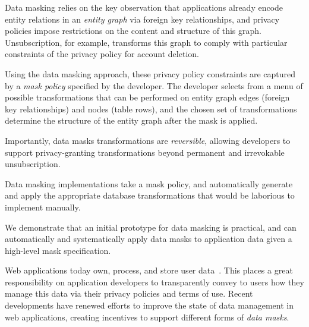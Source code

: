 Data masking relies on the key observation that applications already encode entity relations in an
\emph{entity graph} via \eg foreign key relationships, and privacy policies impose restrictions on the
content and structure of this graph. Unsubscription, for example, transforms this graph to comply
with particular constraints of the privacy policy for account deletion.

Using the data masking approach, these privacy policy constraints are captured by a \emph{mask
policy} specified by the developer. The developer selects from a menu of
possible transformations that can be performed on entity graph edges (foreign key relationships) and
nodes (table rows), and the chosen set of transformations determine the structure of the 
entity graph after the mask is applied. 

Importantly, data masks transformations are \emph{reversible}, allowing developers to support
privacy-granting transformations beyond permanent and irrevokable unsubscription. 

Data masking implementations take a mask policy, and automatically generate and apply the
appropriate database transformations that would be laborious to implement manually. 

We demonstrate that an initial prototype for data masking is practical, and can automatically and
systematically apply data masks to application data given a high-level mask specification.

%

\iffalse
Web applications today own, process, and store user data~\cite{nytimes:fb, npr:data}. This places a
great responsibility on application developers to transparently convey to users how they manage this
data via their privacy policies and terms of use.
%
Recent developments have renewed efforts to improve the state of data management in web
applications, creating incentives to support different forms of \emph{data masks}.

